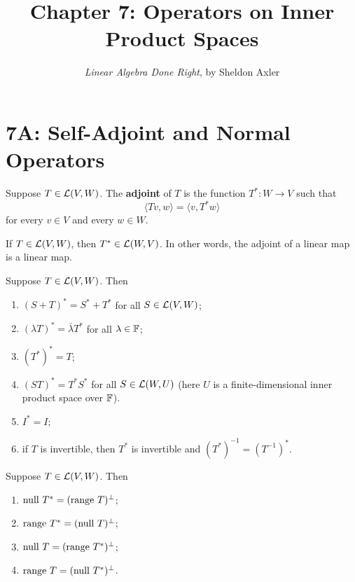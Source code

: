 \documentclass{extarticle}
\title{\vspace{-2em}Chapter 7: Operators on Inner Product Spaces}
\author{\emph{Linear Algebra Done Right}, by Sheldon Axler}
\date{}
\begin{document}
\maketitle 
\tableofcontents

\newpage 




\newpage 
\section*{7A: Self-Adjoint and Normal Operators}


\begin{definition}[adjoint, \(T^*\)]
    Suppose \( T \in \mathcal{L}(V, W)\). The \textbf{adjoint} of \(T\) is the function \(T^* \colon W \to V\) such 
    that 
    \[\langle Tv,w \rangle = \langle v,T^* w \rangle\]
    for every \(v \in V\) and every \(w \in W\).
\end{definition}

\begin{corollary}
    If \(T \in \mathcal{L}(V, W)\), then \(T^* \in \mathcal{L}(W, V)\). In other words, the adjoint of 
    a linear map is a linear map.
\end{corollary}


\begin{corollary}
    Suppose \(T \in \mathcal{L}(V, W)\). Then 
    \begin{enumerate}[label=(\alph*)]
        \item \((S + T)^* = S^* + T^*\) for all \(S \in \mathcal{L}(V, W)\); 
        \item \((\lambda T)^* = \overline{\lambda} T^*\) for all \(\lambda \in \mathbb{F}\); 
        \item \((T^*)^* = T\); 
        \item \((ST)^* = T^* S^*\) for all \(S \in \mathcal{L}(W, U)\) (here \(U\) is a finite-dimensional 
        inner product space over \(\mathbb{F}\)). 
        \item \(I^* = I\); 
        \item if \(T\) is invertible, then \(T^*\) is invertible and \((T^*)^{-1} = (T^{-1})^*\).
    \end{enumerate}
\end{corollary}

\begin{thm}
Suppose \(T \in \mathcal{L}(V, W)\). Then 
\begin{enumerate}[label=(\alph*)]
    \item \(\text{null } T^* = (\text{range } T)^\perp\); 
    \item \(\text{range } T^* = (\text{null } T)^\perp\); 
    \item \(\text{null } T = (\text{range } T^*)^\perp\); 
    \item \(\text{range } T = (\text{null } T^*)^\perp\).
\end{enumerate}
\end{thm}
\end{document}

